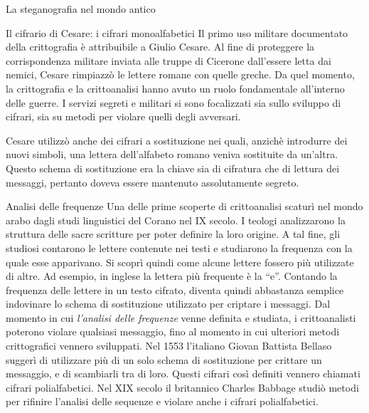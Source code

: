 \documentclass[final,hyperref={pdfpagelabels=false}]{beamer}
\begin{document}
\begin{frame}{}
\begin{columns}[t]
\begin{column}{.3\linewidth}
\begin{block}{La steganografia nel mondo antico}
        \end{block}
        \begin{block}{Il cifrario di Cesare: i cifrari monoalfabetici}
          Il primo uso militare documentato della crittografia è attribuibile a Giulio Cesare. Al fine di proteggere la corrispondenza militare inviata alle truppe di Cicerone dall'essere letta dai nemici, Cesare rimpiazzò le lettere romane con quelle greche. Da quel momento, la crittografia e la crittoanalisi hanno avuto un ruolo fondamentale all'interno delle guerre. I servizi segreti e militari si sono focalizzati sia sullo sviluppo di cifrari, sia su metodi per violare quelli degli avversari. \par
          Cesare utilizzò anche dei cifrari a sostituzione nei quali, anzichè introdurre dei nuovi simboli, una lettera dell'alfabeto romano veniva sostituite da un'altra. Questo schema di sostituzione era la chiave sia di cifratura che di lettura dei messaggi, pertanto doveva essere mantenuto assolutamente segreto.
        \end{block}

        \begin{block}{Analisi delle frequenze}
          Una delle prime scoperte di crittoanalisi scaturì nel mondo arabo dagli studi linguistici del Corano nel IX secolo. I teologi analizzarono la struttura delle sacre scritture per poter definire la loro origine. A tal fine, gli studiosi contarono le lettere contenute nei testi e studiarono la frequenza con la quale esse apparivano. Si scoprì quindi come alcune lettere fossero più utilizzate di altre. Ad esempio, in inglese la lettera più frequente è la ``e''. Contando la frequenza delle lettere in un testo cifrato, diventa quindi abbastanza semplice indovinare lo schema di sostituzione utilizzato per criptare i messaggi. Dal momento in cui {\em l'analisi delle frequenze} venne definita e studiata, i crittoanalisti poterono violare qualsiasi messaggio, fino al momento in cui ulteriori metodi crittografici vennero sviluppati. Nel 1553 l'italiano Giovan Battista Bellaso suggerì di utilizzare più di un solo schema di sostituzione per crittare un messaggio, e di scambiarli tra di loro. Questi cifrari così definiti vennero chiamati cifrari polialfabetici. Nel XIX secolo il britannico Charles Babbage studiò metodi per rifinire l'analisi delle sequenze e violare anche i cifrari polialfabetici.
        \end{block}


\end{column}
\end{columns}
\end{frame}
\end{document}
